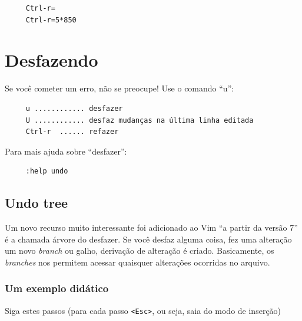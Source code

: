 \documentclass[10pt,a4paper,openany]{book}
\begin{document}
\begin{verbatim}
     Ctrl-r=
     Ctrl-r=5*850
\end{verbatim}


\section{Desfazendo}
\label{Desfazendo}

Se você cometer um erro, não se preocupe! Use o comando ``u'':

\begin{verbatim}
     u ............ desfazer
     U ............ desfaz mudanças na última linha editada
     Ctrl-r  ...... refazer
\end{verbatim}

Para mais ajuda sobre ``desfazer'':

\begin{verbatim}
     :help undo
\end{verbatim}

\subsection{Undo tree}
\label{Undo tree}

Um novo recurso muito interessante foi adicionado ao Vim ``a partir da
versão 7''  é a chamada árvore do desfazer.  Se
você desfaz alguma coisa, fez uma alteração um novo {\em branch} ou
galho, derivação de alteração é criado.  Basicamente, os {\em branches}
nos permitem acessar quaisquer alterações ocorridas no arquivo.

\subsubsection{Um exemplo didático}
\label{Um exemplo didático}

Siga estes passos (para cada passo \verb|<Esc>|, ou seja, saia do modo
de inserção)
\end{document}
